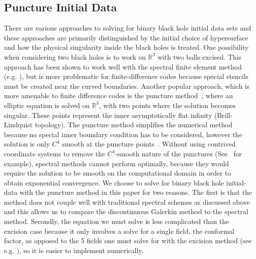 

\subsection{Puncture Initial Data}
\label{sec:punctureinitialdata}

There are various approaches to solving for binary black hole initial
data sets and these approaches are primarily distinguished by the
initial choice of hypersurface and how the physical singularity inside
the black holes is treated. One possibility when considering two black
holes is to work on $\mathbb{R}^{3}$ with two balls excised\cite{cook1994,cook2004excision,caudill2006circular}. This approach has
been shown to work well with the spectral finite element method
(e.g. \cite{pfeiffer2003multidomain}), but is more problematic for
finite-difference codes because special stencils must be created near
the curved boundaries. Another popular approach, which is more
amenable to finite difference codes is the puncture method~\cite{brandt1997simple},
where an elliptic equation is solved on $\mathbb{R}^3$, with
two points where the solution becomes singular.  These points represent
the inner asymptotically flat infinity (Brill-Lindquist
topology).   The puncture
method simplifies the numerical method because no special inner
boundary condition has to be considered, however the solution is only
$C^4$ smooth at the puncture points~\cite{brandt1997simple}. Without using contrived
coordinate systems to remove the $C^4$-smooth nature of the
punctures (See~\cite{ansorg2004single} for example), spectral methods
cannot perform optimally, because they would require the solution to
be smooth on the computational domain in order to obtain exponential
convergence. We choose to solve for binary black hole initial-data
with the puncture method in this paper for two reasons. The first is
that the method does not couple well with traditional spectral schemes
as discussed above and this allows us to compare the discontinuous
Galerkin method to the spectral method. Secondly, the equation we must
solve is less complicated than the excision case because it only
involves a solve for a single field, the conformal factor, as opposed
to the 5 fields one must solve for with the excision method (see
e.g. \cite{pfeiffer2003multidomain}), so it is easier to implement
numerically.

